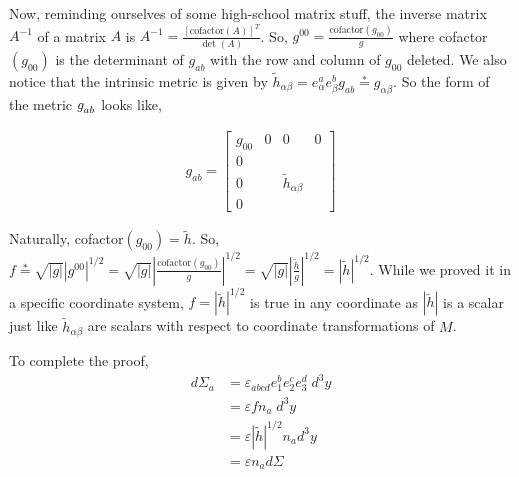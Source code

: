 Now, reminding ourselves of some high-school matrix stuff, the inverse matrix $ A^{-1} $ of a matrix $ A$ is $A^{-1} = \frac{[\text{cofactor}(A)]^T}{\det(A)}$. So, $g^{00} = \frac{\text{cofactor}(g_{00})}{g}$ where cofactor$(g_{00})$ is the determinant of $g_{ab}$ with the row and column of $g_{00}$ deleted. We also notice that the intrinsic metric is given by $\tilde h_{\alpha\beta} = e^a_\alpha e^b_\beta g_{ab} \overset{*}{=} g_{\alpha\beta}$. So the form of the metric $ \tt{g}{}{ab}$ looks like, 

\begin{align*}
	g_{ab} = \begin{bmatrix} g_{00} & 0 & 0 & 0 \\ 0 & & & \\ 0 & & \tilde h_{\alpha\beta} & \\ 0 & & & \end{bmatrix}
\end{align*}

Naturally, cofactor$(g_{00}) = \tilde h$. So, $f \overset{*}{=} \sqrt{|g|} |g^{00}|^{1/2} =\sqrt{|g|} |\frac{\text{cofactor}(g_{00})}{g}|^{1/2}= \sqrt{|g|} |\frac{ \tilde{h}}{g}|^{1/2} = |\tilde h|^{1/2}$. While we proved it in a specific coordinate system, $f = |\tilde h|^{1/2}$ is true in any coordinate as $|\tilde h|$ is a scalar just like $\tilde h_{\alpha\beta}$ are scalars with respect to coordinate transformations of $M$.

To complete the proof, 
\begin{align*}
    d\Sigma_a &= \varepsilon_{abcd} e^b_1 e^c_2 e^d_3 \; d^3 y\\
    &= \varepsilon f n_a \; d^3 y\\
	&= \varepsilon |\tilde h|^{1/2} n_a d^3 y \\
	&= \varepsilon n_a d\Sigma
\end{align*}